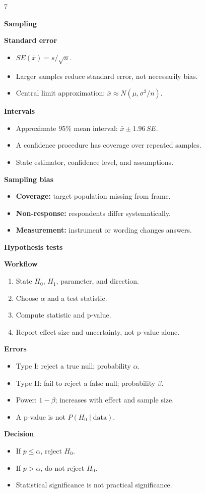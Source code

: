\documentclass[a4paper,landscape]{article}
\newcommand{\hlhighlight}[1]{\par\smallskip\noindent\colorbox{banner}{\strut\textbf{#1}}\par}
\newcommand{\sectitle}[1]{\par\smallskip\noindent\textcolor{section}{\textbf{#1}}\par}
\newcommand{\category}[1]{\textcolor{category}{\textbf{#1}}}
\begin{document}
\begin{multicols}{7}
\hlhighlight{Sampling}
\sectitle{Standard error}
\begin{itemize}
\item $SE(\bar{x})=s/\sqrt{n}$.
\item Larger samples reduce standard error, not necessarily bias.
\item Central limit approximation: $\bar{x}\approx N(\mu,\sigma^2/n)$.
\end{itemize}
\sectitle{Intervals}
\begin{itemize}
\item Approximate 95\% mean interval: $\bar{x}\pm1.96\,SE$.
\item A confidence procedure has coverage over repeated samples.
\item State estimator, confidence level, and assumptions.
\end{itemize}
\sectitle{Sampling bias}
\begin{itemize}
\item \category{Coverage:} target population missing from frame.
\item \category{Non-response:} respondents differ systematically.
\item \category{Measurement:} instrument or wording changes answers.
\end{itemize}

\hlhighlight{Hypothesis tests}
\sectitle{Workflow}
\begin{enumerate}
\item State $H_0$, $H_1$, parameter, and direction.
\item Choose $\alpha$ and a test statistic.
\item Compute statistic and p-value.
\item Report effect size and uncertainty, not p-value alone.
\end{enumerate}
\sectitle{Errors}
\begin{itemize}
\item Type I: reject a true null; probability $\alpha$.
\item Type II: fail to reject a false null; probability $\beta$.
\item Power: $1-\beta$; increases with effect and sample size.
\item A p-value is not $P(H_0\mid\text{data})$.
\end{itemize}
\sectitle{Decision}
\begin{itemize}
\item If $p\le\alpha$, reject $H_0$.
\item If $p>\alpha$, do not reject $H_0$.
\item Statistical significance is not practical significance.
\end{itemize}


\end{multicols}
\end{document}
